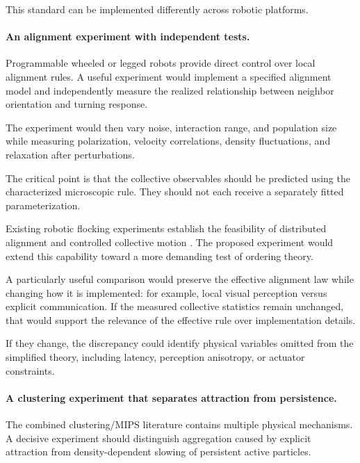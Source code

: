 This standard can be implemented differently
across robotic platforms.

\paragraph*{An alignment experiment with independent tests.}

Programmable wheeled or legged robots provide
direct control over local alignment rules.
A useful experiment would implement a
specified alignment model and independently
measure the realized relationship between
neighbor orientation and turning response.

The experiment would then vary noise,
interaction range, and population size
while measuring polarization,
velocity correlations, density
fluctuations, and relaxation
after perturbations.

The critical point is that the collective
observables should be predicted using
the characterized microscopic rule.
They should not each receive a
separately fitted parameterization.

Existing robotic flocking experiments
establish the feasibility of distributed
alignment and controlled collective
motion
\cite{Turgut2008selforganizedflocka,Tarcai2011patternstransition,Vsrhelyi2018optimizedflockingo,Zhou2024anticipationpromote,Verdoucq2025flockingphasetrans}.
The proposed experiment would extend
this capability toward a more demanding
test of ordering theory.

A particularly useful comparison would
preserve the effective alignment law
while changing how it is implemented:
for example, local visual perception
versus explicit communication.
If the measured collective statistics
remain unchanged, that would support
the relevance of the effective rule
over implementation details.

If they change, the discrepancy could
identify physical variables omitted
from the simplified theory, including
latency, perception anisotropy,
or actuator constraints.

\paragraph*{A clustering experiment that separates attraction from persistence.}

The combined clustering/MIPS literature
contains multiple physical mechanisms.
A decisive experiment should distinguish
aggregation caused by explicit attraction
from density-dependent slowing of
persistent active particles.

